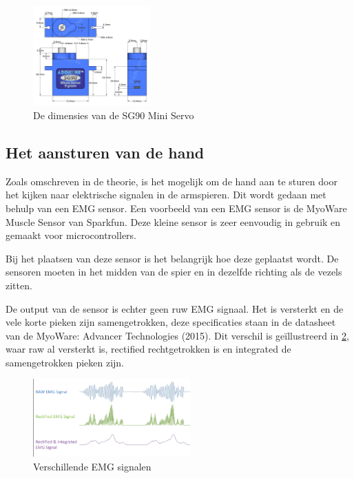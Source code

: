 \begin{figure}
\centering
\includegraphics[width=0.4\textwidth,height=\textheight]{img/image_21.png}
\caption{De dimensies van de SG90 Mini Servo\label{fig:servo}}
\end{figure}

\hypertarget{het-aansturen-van-de-hand}{%
\subsection{Het aansturen van de hand}\label{het-aansturen-van-de-hand}}

Zoals omschreven in de theorie, is het mogelijk om de hand aan te sturen
door het kijken naar elektrische signalen in de armspieren. Dit wordt
gedaan met behulp van een EMG sensor. Een voorbeeld van een EMG sensor
is de MyoWare Muscle Sensor van Sparkfun. Deze kleine sensor is zeer
eenvoudig in gebruik en gemaakt voor microcontrollers.

Bij het plaatsen van deze sensor is het belangrijk hoe deze geplaatst
wordt. De sensoren moeten in het midden van de spier en in dezelfde
richting als de vezels zitten.

De output van de sensor is echter geen ruw EMG signaal. Het is versterkt
en de vele korte pieken zijn samengetrokken, deze specificaties staan in
de datasheet van de MyoWare: Advancer Technologies (2015). Dit verschil
is geïllustreerd in \cref{fig:emg}, waar raw al versterkt
is, rectified rechtgetrokken is en integrated de samengetrokken pieken
zijn.

\begin{figure}
\centering
\includegraphics[width=0.54\textwidth,height=\textheight]{img/image_22.png}
\caption{Verschillende EMG signalen\label{fig:emg}}
\end{figure}


